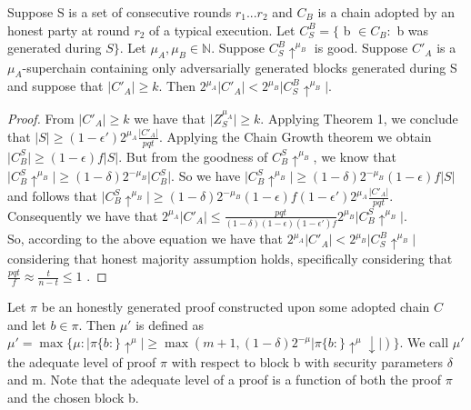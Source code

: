 \begin{lemma}
	Suppose S is a set of consecutive rounds $r_1 ... r_2$
	and $C_B$ is a chain adopted by an honest party at round $r_2$ of a typical
	execution. Let $C^{B}_{S} = \{$ b $\in C_B:$ b was generated during $S\}$. Let
	$\mu_A, \mu_B \in \mathbb{N}$. Suppose $C^{B}_{S}\uparrow^{\mu_B}$ is good.
	Suppose $C'_A$ is a $\mu_A$-superchain containing only adversarially generated
	blocks generated during S and suppose that $\vert C'_A \vert \geq k$. Then
	$2^{\mu_A} \vert C'_A \vert <  2^{\mu_B} \vert    C^{B}_{S}\uparrow^{\mu_B}\vert $.
	\label{lemma:honest_vs_pure_adversarial_subchain}
\end{lemma}
\begin{proof}
	From $\vert C'_A \vert \geq k$ we have that $\vert Z^{\mu_A}_S
	\vert \geq k$. Applying Theorem 1, we conclude that $\vert S \vert \geq
	(1-\epsilon')2^{\mu_A} \frac{\vert C'_A \vert}{pqt}$. Applying the Chain Growth
	theorem \cite{backbone} we obtain $\vert C_{B}^S \vert \geq (1 - \epsilon)f
	\vert S \vert$. But from the goodness of $C_{B}^S \uparrow^{\mu_B}$, we know
	that $\vert C_{B}^S\uparrow^{\mu_B} \vert \geq (1 - \delta)2^{-\mu_B} \vert
	C_{B}^S \vert $. So we have $\vert C_{B}^S\uparrow^{\mu_B} \vert \geq
	(1 - \delta)2^{-\mu_B} (1 - \epsilon)f \vert S \vert $ and follows that
	$\vert C_{B}^S\uparrow^{\mu_B} \vert \geq (1 - \delta)2^{-\mu_B} (1 - \epsilon)f
	(1-\epsilon')2^{\mu_A} \frac{\vert C'_A \vert}{pqt} $. Consequently we have that
	$2^{\mu_A} \vert C'_A \vert \leq \frac{pqt}{(1- \delta)(1-\epsilon)(1-\epsilon')f}
	2^{\mu_B} \vert C_{B}^S\uparrow^{\mu_B} \vert $.   \\

	So, according to the above equation we have that $2^{\mu_A} \vert C'_A \vert
	<  2^{\mu_B} \vert    C^{B}_{S}\uparrow^{\mu_B}\vert $ considering that honest
	majority assumption holds, specifically considering that $ \frac{pqt}{f} \approx
	\frac{t}{n-t} \leq 1 $ .
\end{proof}

\begin{defn}
	Let $\pi$ be an
	honestly generated proof constructed upon some adopted chain $C$ and let $b \in 
	\pi $. Then $\mu'$ is defined as $\mu' = \max \{ \mu: \vert \pi\{b:\}\uparrow^{\mu}
	\vert \geq \max( m+1, (1-\delta)2^{-\mu} \vert \pi\{b:\}\uparrow^{\mu}\downarrow \vert )\}$.
	We call $\mu'$ the adequate level of proof $\pi$ with respect to block b with
	security parameters $\delta$ and m. Note that the adequate level of a proof is a
	function of both the proof $\pi$ and the chosen block b.
\end{defn}

